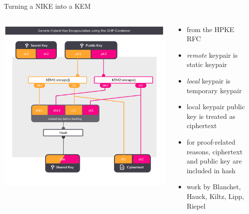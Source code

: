 \begin{frame}{Turning a NIKE into a KEM}
  \begin{columns}[c]
    \begin{column}{.6\linewidth}
      \includegraphics[height=.92\textheight,page=2,clip=true,trim={0.5cm 1cm 0.7cm 1.5cm}]{graphics/rosenpass-encapsulation-combiner.pdf}
    \end{column}

    \begin{column}{.4\linewidth}
      \small
      \begin{itemize}
        \item from the HPKE RFC \citeHpke
        \item \emph{remote} keypair is static keypair
        \item \emph{local} keypair is temporary keypair
        \item local keypair public key is treated as ciphertext
        \item for proof-related reasons, ciphertext and public key
          are included in hash
        \item work by Blanchet, Hauck, Kiltz, Lipp, Riepel
      \end{itemize}
    \end{column}
  \end{columns}
\end{frame}


